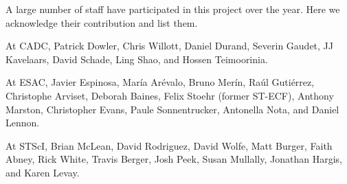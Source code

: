 \documentclass[11pt,twoside]{article}
\begin{document}
A large number of staff have participated in this project over the year. 
Here we acknowledge their contribution and list them.

At CADC, Patrick Dowler, Chris Willott, Daniel Durand, Severin Gaudet, JJ Kavelaars, David Schade, Ling Shao, and Hossen Teimoorinia.

At ESAC, Javier Espinosa, María Arévalo, Bruno Merín, Raúl Gutiérrez, Christophe Arviset, Deborah Baines, Felix Stoehr (former ST-ECF), Anthony Marston, Christopher Evans, Paule Sonnentrucker, Antonella Nota, and Daniel Lennon.

At STScI, Brian McLean, David Rodriguez, David Wolfe, Matt Burger, Faith Abney, Rick White, Travis Berger, Josh Peek, Susan Mullally, Jonathan Hargis, and Karen Levay.



\end{document}
